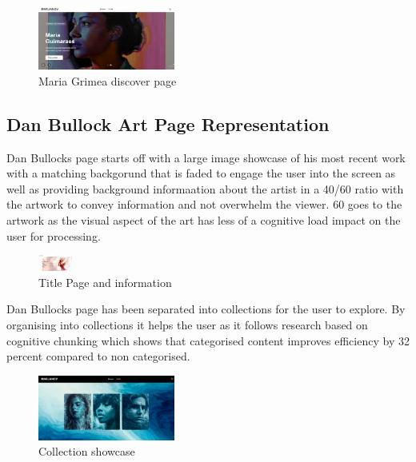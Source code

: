 \documentclass[]{project_final}
\begin{document}
\begin{figure}[ht!]
    \centering
    \includegraphics[width=0.4\textwidth]{AG10.png}
    \vspace*{0.0cm}
    \caption{Maria Grimea discover page}
    \label{fig:1}
\end{figure}

\subsection{Dan Bullock Art Page Representation}
Dan Bullocks page starts off with a large image showcase of his most recent work with a matching backgorund that is faded to engage the user into the screen as well as providing background informaation about the artist in a 40/60 ratio with the artwork to convey information and not overwhelm the viewer. 60 goes to the artwork as the visual aspect of the art has less of a cognitive load impact on the user for processing.

\begin{figure}[H]
    \centering
    \includegraphics[width=0.1\textwidth]{AG11.png}
    \vspace*{0.0cm}
    \caption{Title Page and information}
    \label{fig:1}
\end{figure}

Dan Bullocks page has been separated into collections for the user to explore. By organising into collections it helps the user as it follows research based on cognitive chunking  which shows that categorised content improves efficiency by 32 percent compared to non categorised.

\begin{figure}[ht!]
    \centering
    \includegraphics[width=0.4\textwidth]{AG12.png}
    \vspace*{0.0cm}
    \caption{Collection showcase}
    \label{fig:1}
\end{figure}
\end{document}
